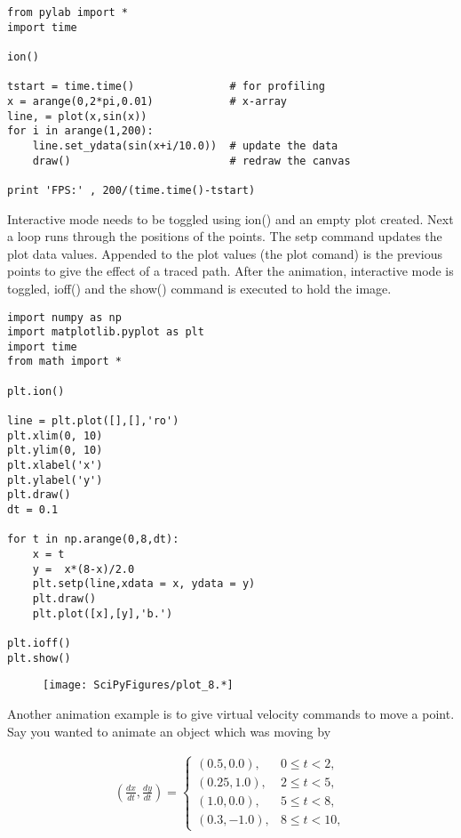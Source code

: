 \begin{verbatim}
from pylab import *
import time

ion()

tstart = time.time()               # for profiling
x = arange(0,2*pi,0.01)            # x-array
line, = plot(x,sin(x))
for i in arange(1,200):
    line.set_ydata(sin(x+i/10.0))  # update the data
    draw()                         # redraw the canvas

print 'FPS:' , 200/(time.time()-tstart)
\end{verbatim}

Interactive mode needs to be toggled using ion() and an empty plot
created. Next a loop runs through the positions of the points. The setp
command updates the plot data values. Appended to the plot values (the
plot comand) is the previous points to give the effect of a traced path.
After the animation, interactive mode is toggled, ioff() and the show()
command is executed to hold the image.

\begin{verbatim}
import numpy as np
import matplotlib.pyplot as plt
import time
from math import *

plt.ion()

line = plt.plot([],[],'ro')
plt.xlim(0, 10)
plt.ylim(0, 10)
plt.xlabel('x')
plt.ylabel('y')
plt.draw()
dt = 0.1

for t in np.arange(0,8,dt):
    x = t
    y =  x*(8-x)/2.0
    plt.setp(line,xdata = x, ydata = y)
    plt.draw()
    plt.plot([x],[y],'b.')

plt.ioff()
plt.show()
\end{verbatim}

\begin{figure}
\centering
\texttt{[image: SciPyFigures/plot\_8.*]}
\caption{}
\end{figure}

Another animation example is to give virtual velocity commands to move a
point. Say you wanted to animate an object which was moving by

\[\begin{aligned}
\displaystyle \left(\frac{dx}{dt}, \frac{dy}{dt}\right) =
\left\{
\begin{array}{ll}
(0.5, 0.0),  & 0 \leq t < 2, \\[3mm]
(0.25, 1.0),  & 2 \leq t < 5, \\[3mm]
(1.0, 0.0),  & 5 \leq t < 8, \\[3mm]
(0.3, -1.0), & 8 \leq t < 10,
\end{array}
\right.
\end{aligned}\]

